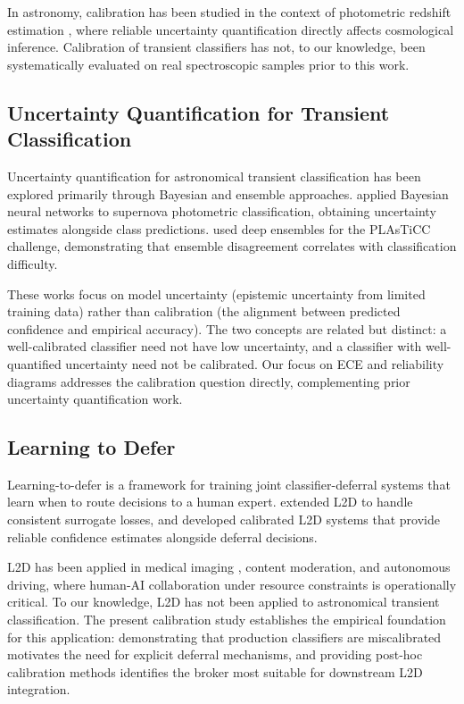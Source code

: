 In astronomy, calibration has been studied in the context 
of photometric redshift estimation \citep{Bordoloi2010, 
Schmidt2020}, where reliable uncertainty quantification 
directly affects cosmological inference. Calibration of 
transient classifiers has not, to our knowledge, been 
systematically evaluated on real spectroscopic samples 
prior to this work.

\subsection{Uncertainty Quantification for Transient Classification}
\label{sec:related:uq}

Uncertainty quantification for astronomical transient 
classification has been explored primarily through 
Bayesian and ensemble approaches. \citet{Möller2020} 
applied Bayesian neural networks to supernova 
photometric classification, obtaining uncertainty 
estimates alongside class predictions. \citet{Villar2019} 
used deep ensembles for the PLAsTiCC challenge, 
demonstrating that ensemble disagreement correlates 
with classification difficulty.

These works focus on model uncertainty (epistemic 
uncertainty from limited training data) rather than 
calibration (the alignment between predicted confidence 
and empirical accuracy). The two concepts are related 
but distinct: a well-calibrated classifier need not 
have low uncertainty, and a classifier with well-quantified 
uncertainty need not be calibrated. Our focus on ECE 
and reliability diagrams addresses the calibration 
question directly, complementing prior uncertainty 
quantification work.

\subsection{Learning to Defer}
\label{sec:related:l2d}

Learning-to-defer \citep[L2D;][]{Madras2018} is a 
framework for training joint classifier-deferral systems 
that learn when to route decisions to a human expert. 
\citet{Mozannar2020} extended L2D to handle consistent 
surrogate losses, and \citet{Verma2022} developed 
calibrated L2D systems that provide reliable confidence 
estimates alongside deferral decisions.

L2D has been applied in medical imaging 
\citep{Tschandl2019}, content moderation, and 
autonomous driving, where human-AI collaboration 
under resource constraints is operationally critical. 
To our knowledge, L2D has not been applied to 
astronomical transient classification. The present 
calibration study establishes the empirical foundation 
for this application: demonstrating that production 
classifiers are miscalibrated motivates the need for 
explicit deferral mechanisms, and providing post-hoc 
calibration methods identifies the broker most 
suitable for downstream L2D integration.
